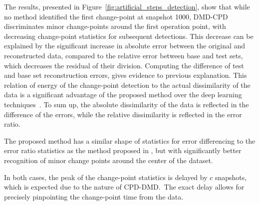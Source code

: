 The results, presented in Figure~\ref{fig:artificial_steps_detection}, show that while no method identified the first change-point at snapshot 1000, DMD-CPD discriminates minor change-points around the first operation point, with decreasing change-point statistics for subsequent detections. This decrease can be explained by the significant increase in absolute error between the original and reconstructed data, compared to the relative error between base and test sets, which decreases the residual of their division. Computing the difference of test and base set reconstruction errors, gives evidence to previous explanation. This relation of energy of the change-point detection to the actual dissimilarity of the data is a significant advantage of the proposed method over the deep learning techniques~\citep{DeRyck2021}. To sum up, the absolute dissimilarity of the data is reflected in the difference of the errors, while the relative dissimilarity is reflected in the error ratio.

The proposed method has a similar shape of statistics for error differencing to the error ratio statistics as the method proposed in \citet{Kawahara2007}, but with significantly better recognition of minor change points around the center of the dataset.

In both cases, the peak of the change-point statistics is delayed by \(c\) snapshots, which is expected due to the nature of CPD-DMD.~The exact delay allows for precisely pinpointing the change-point time from the data.

